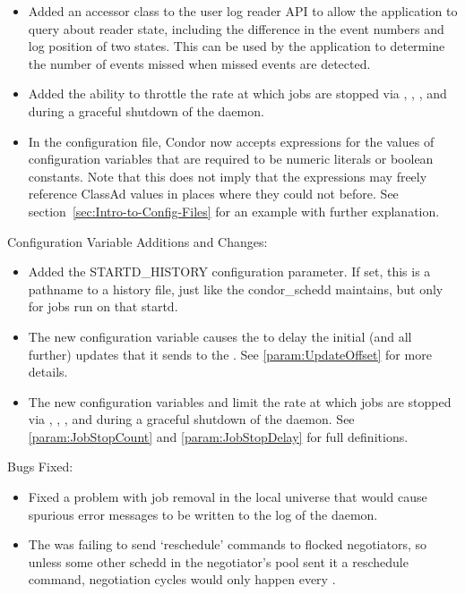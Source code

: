 \begin{itemize}
\item Added an accessor class to the user log reader API to allow the
  application to query about reader state, including the
  difference in the event numbers and log position of two states.  This
  can be used by the application to determine the number of events
  missed when missed events are detected.

\item Added the ability to throttle the rate at which jobs are
stopped via , , ,
and during a graceful shutdown of the  daemon.

\item In the configuration file, Condor now accepts expressions for
the values of configuration variables that are required to be 
numeric literals or boolean constants.  
Note that this does not imply that the
expressions may freely reference ClassAd values in places where they
could not before.  
See section~\ref{sec:Intro-to-Config-Files} for an example with
further explanation.

\end{itemize}

\noindent Configuration Variable Additions and Changes:

\begin{itemize}

\item Added the STARTD\_HISTORY configuration parameter.  If set, this
is a pathname to a history file, just like the condor\_schedd maintains,
but only for jobs run on that startd.

\item The new configuration variable  
  causes the  to
  delay the initial (and all further) updates that it sends to the
  .  See \ref{param:UpdateOffset} for more details.

\item The new configuration variables
   and 
  limit the rate at which jobs are stopped via ,
  , , and during a graceful shutdown of
  the  daemon.
  See \ref{param:JobStopCount} and \ref{param:JobStopDelay} 
  for full definitions.

\end{itemize}

\noindent Bugs Fixed:

\begin{itemize}

\item Fixed a problem with job removal in the local universe that 
  would cause spurious error messages to be written to the log of the
   daemon.

\item The  was failing to send `reschedule' commands to
flocked negotiators, so unless some other schedd in the negotiator's
pool sent it a reschedule command, negotiation cycles would only
happen every .

\end{itemize}

